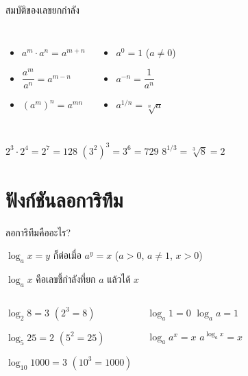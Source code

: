 \documentclass[11pt, aspectratio=169]{beamer}
\begin{document}
\begin{frame}{สมบัติของเลขยกกำลัง}
  \begin{explanation}
    \begin{columns}[T]
        \begin{itemize}
          \item $a^m \cdot a^n = a^{m+n}$
          \item $\dfrac{a^m}{a^n} = a^{m-n}$
          \item $(a^m)^n = a^{mn}$
        \end{itemize}
        \begin{itemize}
          \item $a^0 = 1$ \quad ($a \neq 0$)
          \item $a^{-n} = \dfrac{1}{a^n}$
          \item $a^{1/n} = \sqrt[n]{a}$
        \end{itemize}
    \end{columns}
  \end{explanation}

  \begin{exambox}[ตัวอย่าง]
    $2^3 \cdot 2^4 = 2^{7} = 128$ \qquad
    $(3^2)^3 = 3^{6} = 729$ \qquad
    $8^{1/3} = \sqrt[3]{8} = 2$
  \end{exambox}
\end{frame}

\section{ฟังก์ชันลอการิทึม}

\begin{frame}{ลอการิทึมคืออะไร?}
  \begin{explanation}[นิยาม]
    $\log_a x = y$ \quad ก็ต่อเมื่อ \quad $a^y = x$ \qquad ($a > 0$, $a \neq 1$, $x > 0$)

     $\log_a x$ คือเลขชี้กำลังที่ยก $a$ แล้วได้ $x$
  \end{explanation}

  \begin{columns}[T]
      \begin{exambox}[ตัวอย่าง]
        $\log_2 8 = 3$ \quad $(2^3 = 8)$

        $\log_5 25 = 2$ \quad $(5^2 = 25)$

        $\log_{10} 1000 = 3$ \quad $(10^3 = 1000)$
      \end{exambox}
      \begin{exambox}[ค่าพิเศษ]
        $\log_a 1 = 0$ \quad $\log_a a = 1$

        $\log_a a^x = x$ \quad $a^{\log_a x} = x$
      \end{exambox}
  \end{columns}
\end{frame}
\end{document}
